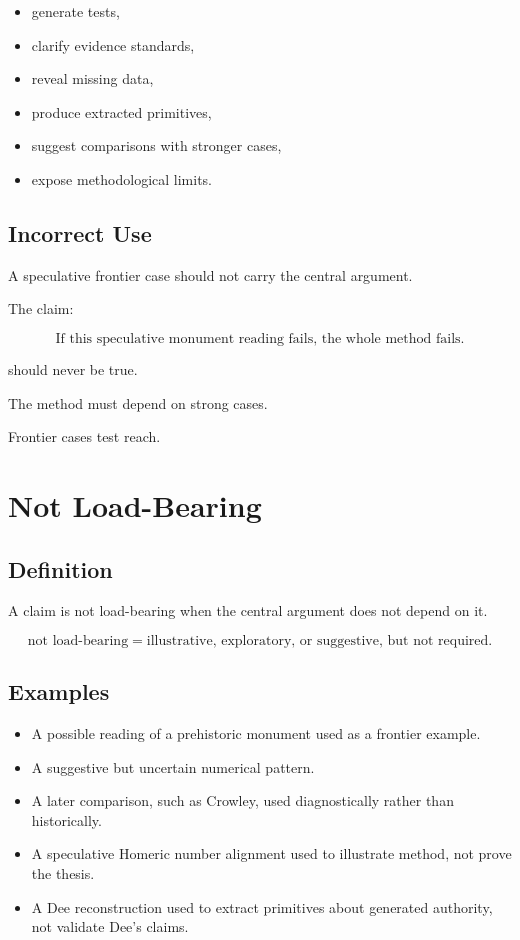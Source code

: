 \documentclass[11pt]{book}
\begin{document}
\begin{itemize}
    \item generate tests,
    \item clarify evidence standards,
    \item reveal missing data,
    \item produce extracted primitives,
    \item suggest comparisons with stronger cases,
    \item expose methodological limits.
\end{itemize}

\subsection{Incorrect Use}

A speculative frontier case should not carry the central argument.

The claim:

\[
\text{If this speculative monument reading fails, the whole method fails.}
\]

should never be true.

The method must depend on strong cases.

Frontier cases test reach.

\section{Not Load-Bearing}

\subsection{Definition}

A claim is not load-bearing when the central argument does not depend on it.

\[
\text{not load-bearing} = \text{illustrative, exploratory, or suggestive, but not required}.
\]

\subsection{Examples}

\begin{itemize}
    \item A possible reading of a prehistoric monument used as a frontier example.
    \item A suggestive but uncertain numerical pattern.
    \item A later comparison, such as Crowley, used diagnostically rather than historically.
    \item A speculative Homeric number alignment used to illustrate method, not prove the thesis.
    \item A Dee reconstruction used to extract primitives about generated authority, not validate Dee's claims.
\end{itemize}
\end{document}
